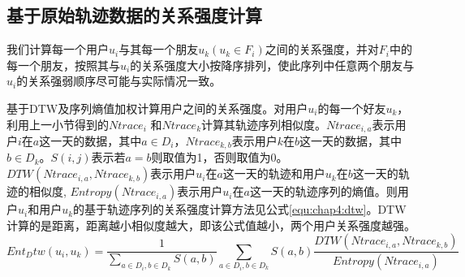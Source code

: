\subsection{基于原始轨迹数据的关系强度计算}
我们计算每一个用户$u_{i}$与其每一个朋友$u_{k}(u_{k}\in F_{i})$之间的关系强度，并对$F_{i}$中的每一个朋友，按照其与$u_{i}$的关系强度大小按降序排列，使此序列中任意两个朋友与$u_{i}$的关系强弱顺序尽可能与实际情况一致。
\par 基于DTW及序列熵值加权计算用户之间的关系强度。对用户$u_{i}$的每一个好友$u_{k}$，利用上一小节得到的$Ntrace_{i}$ 和$Ntrace_{k}$计算其轨迹序列相似度。$Ntrace_{i,a}$表示用户$i$在$a$这一天的数据，其中$a\in D_{i}$，$Ntrace_{k,b}$表示用户$k$在$b$这一天的数据，其中$b\in D_{k}$。$S(i,j)$表示若$a=b$则取值为1，否则取值为0。$DTW(Ntrace_{i,a},Ntrace_{k,b})$表示用户$u_{i}$在$a$这一天的轨迹和用户$u_{k}$在$b$这一天的轨迹的相似度, $Entropy(Ntrace_{i,a})$表示用户$u_{i}$在$a$这一天的轨迹序列的熵值。则用户$u_{i}$和用户$u_{k}$的基于轨迹序列的关系强度计算方法见公式\ref{equ:chap4:dtw}。DTW计算的是距离，距离越小相似度越大，即该公式值越小，两个用户关系强度越强。
\begin{equation}
\label{equ:chap4:dtw}
Ent_Dtw(u_{i},u_{k})=\frac{1}{\sum_{a\in D_{i},b\in D_{k}}S(a,b)}\sum_{a\in D_{i},b\in D_{k}}S(a,b)\frac{DTW(Ntrace_{i,a},Ntrace_{k,b})}{Entropy(Ntrace_{i,a})}
\end{equation}

